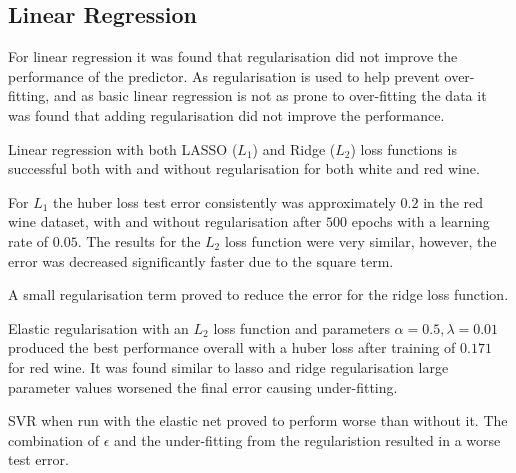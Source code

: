 \documentclass[10pt,twocolumn,letterpaper]{article}
\begin{document}
\subsection{Linear Regression}
For linear regression it was found that regularisation did not improve the performance of the predictor. As regularisation is used to help prevent over-fitting, and as basic linear regression is not as prone to over-fitting the data it was found that adding regularisation did not improve the performance.

Linear regression with both LASSO ($L_1$) and Ridge ($L_2$) loss functions is successful both with and without regularisation for both white and red wine. 

For $L_1$ the huber loss test error consistently was approximately $0.2$ in the red wine dataset, with and without regularisation after $500$ epochs with a learning rate of $0.05$. The results for the $L_2$ loss function were very similar, however,  the error was decreased significantly faster due to the square term. 

A small regularisation term proved to reduce the error for the ridge loss function.

Elastic regularisation with an $L_2$ loss function and parameters $\alpha=0.5, \lambda=0.01$  produced the best performance overall with a huber loss after training of $0.171$ for red wine. It was found similar to lasso and ridge regularisation large parameter values worsened the final error causing under-fitting. 

SVR when run with the elastic net proved to perform worse than without it. The combination of $\epsilon$ and the under-fitting from the regularistion resulted in a worse test error.
\end{document}
